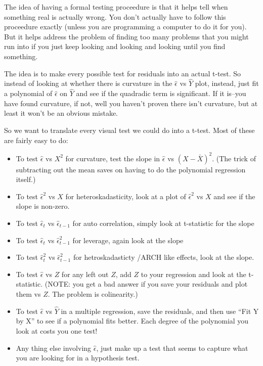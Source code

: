 \documentclass[12pt]{article}
\begin{document}
The idea of having a formal testing proceedure is that it helps tell
 when something real is actually wrong.  You don't actually have to
 follow this proceedure exactly (unless you are programming a computer
 to do it for you).  But it helps address the problem of finding too
many problems that you might run into if you just keep looking and
looking and looking until you find something.

The idea is to make every possible test for residuals into an actual
t-test.  So instead of looking at whether there is curvature in the
$\hat\epsilon$ vs $\hat Y$ plot, instead, just fit a polynomial of
$\hat\epsilon$ on $\hat Y$ and see if the quadradic term is
significant.  If it is--you have found curvature, if not, well you
haven't proven there isn't curvature, but at least it won't be an
obvious mistake.

So we want to translate every visual test we could do into a t-test.
Most of these are fairly easy to do:
\begin{itemize}
\item To test $\hat\epsilon$ vs $X^2$ for curvature, test the
slope in $\hat\epsilon$ vs $(X - \bar X)^2$.  (The trick of
subtracting out the mean saves on having to do the polynomial
regression itself.)
\item To test $\hat\epsilon^2$ vs $X$ for heteroskadasticity, look at a
plot of $\hat\epsilon^2$ vs $X$ and see if the slope is non-zero.
\item To test $\hat\epsilon_t$ vs $\hat\epsilon_{t-1}$ for auto
correlation, simply look at t-statistic for the slope
\item To test $\hat\epsilon_t$ vs $\hat\epsilon_{t-1}^2$ for
 leverage, again look at the slope
\item To test $\hat\epsilon_t^2$ vs $\hat\epsilon_{t-1}^2$ for
hetroskadasticty /ARCH like effects, look at the slope.
\item To test $\hat\epsilon$ vs $Z$ for any left out $Z$, add $Z$ to
your regression and look at the t-statistic.  (NOTE: you get a bad
answer if you save your residuals and plot them vs $Z$.  The problem
is colinearity.)
\item To test $\hat\epsilon$ vs $\hat Y$ in a multiple regression,
save the residuals, and then use ``Fit Y by X'' to see if a polynomial
fits better.  Each degree of the polynomial you look at costs you one
test! 
\item Any thing else involving $\hat\epsilon$, just make up a test
that seems to capture what you are looking for in a hypothesis test.
\end{itemize}
\end{document}
